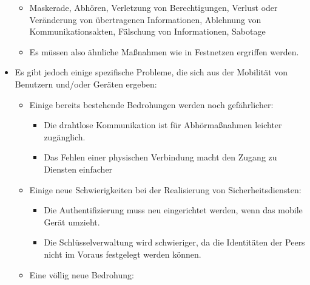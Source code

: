 \documentclass[a4paper]{article}
\begin{document}
\begin{multicols}{3}
\begin{itemize}
              \begin{itemize}
                  \item
                        Maskerade, Abhören, Verletzung von Berechtigungen, Verlust oder
                        Veränderung von übertragenen Informationen, Ablehnung von
                        Kommunikationsakten, Fälschung von Informationen, Sabotage
                  \item
                        Es müssen also ähnliche Maßnahmen wie in Festnetzen ergriffen
                        werden.
              \end{itemize}
        \item
              Es gibt jedoch einige spezifische Probleme, die sich aus der Mobilität
              von Benutzern und/oder Geräten ergeben:

              \begin{itemize}
                  \item
                        Einige bereits bestehende Bedrohungen werden noch gefährlicher:

                        \begin{itemize}
                            \item
                                  Die drahtlose Kommunikation ist für Abhörmaßnahmen leichter
                                  zugänglich.
                            \item
                                  Das Fehlen einer physischen Verbindung macht den Zugang zu
                                  Diensten einfacher
                        \end{itemize}
                  \item
                        Einige neue Schwierigkeiten bei der Realisierung von
                        Sicherheitsdiensten:

                        \begin{itemize}
                            \item
                                  Die Authentifizierung muss neu eingerichtet werden, wenn das
                                  mobile Gerät umzieht.
                            \item
                                  Die Schlüsselverwaltung wird schwieriger, da die Identitäten der
                                  Peers nicht im Voraus festgelegt werden können.
                        \end{itemize}
                  \item
                        Eine völlig neue Bedrohung:


\end{itemize}
\end{itemize}
\end{multicols}
\end{document}
